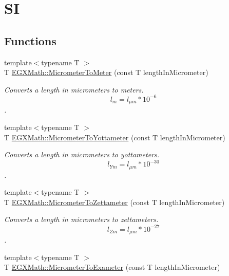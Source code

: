 \hypertarget{group___e_g_x_math-_conversions-_length_conversions-_micrometer-_s_i}{}\section{SI}
\label{group___e_g_x_math-_conversions-_length_conversions-_micrometer-_s_i}
\subsection*{Functions}
\begin{DoxyCompactItemize}
\item 
{\footnotesize template$<$typename T $>$ }\\T \mbox{\hyperlink{group___e_g_x_math-_conversions-_length_conversions-_micrometer-_s_i_ga20cc456329c53dfb121348e03e8b282d}{E\+G\+X\+Math\+::\+Micrometer\+To\+Meter}} (const T length\+In\+Micrometer)
\begin{DoxyCompactList}\small\item\em Converts a length in micrometers to meters. \[ l_{m}=l_{\mu m} * 10^{-6}\]. \end{DoxyCompactList}\item 
{\footnotesize template$<$typename T $>$ }\\T \mbox{\hyperlink{group___e_g_x_math-_conversions-_length_conversions-_micrometer-_s_i_gaeea13656a8abffb34144175cba3b9afc}{E\+G\+X\+Math\+::\+Micrometer\+To\+Yottameter}} (const T length\+In\+Micrometer)
\begin{DoxyCompactList}\small\item\em Converts a length in micrometers to yottameters. \[ l_{Ym}=l_{\mu m} * 10^{-30} \]. \end{DoxyCompactList}\item 
{\footnotesize template$<$typename T $>$ }\\T \mbox{\hyperlink{group___e_g_x_math-_conversions-_length_conversions-_micrometer-_s_i_ga689cb2982c4b1602ccee247011d017d8}{E\+G\+X\+Math\+::\+Micrometer\+To\+Zettameter}} (const T length\+In\+Micrometer)
\begin{DoxyCompactList}\small\item\em Converts a length in micrometers to zettameters. \[ l_{Zm}=l_{\mu m} * 10^{-27} \]. \end{DoxyCompactList}\item 
{\footnotesize template$<$typename T $>$ }\\T \mbox{\hyperlink{group___e_g_x_math-_conversions-_length_conversions-_micrometer-_s_i_ga0801b93a011bf0495bb3c96be2b47734}{E\+G\+X\+Math\+::\+Micrometer\+To\+Exameter}} (const T length\+In\+Micrometer)

\end{DoxyCompactItemize}

